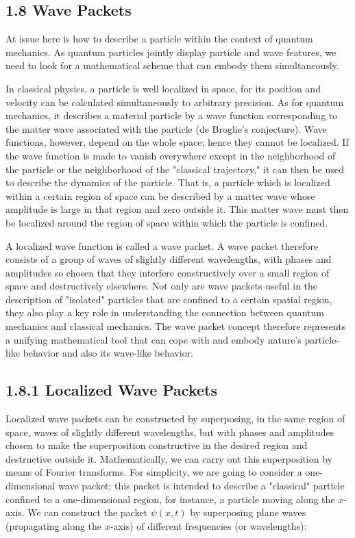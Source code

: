 \documentclass[10pt]{article}
\begin{document}
\subsection*{1.8 Wave Packets}
At issue here is how to describe a particle within the context of quantum mechanics. As quantum particles jointly display particle and wave features, we need to look for a mathematical scheme that can embody them simultaneously.

In classical physics, a particle is well localized in space, for its position and velocity can be calculated simultaneously to arbitrary precision. As for quantum mechanics, it describes a material particle by a wave function corresponding to the matter wave associated with the particle (de Broglie's conjecture). Wave functions, however, depend on the whole space; hence they cannot be localized. If the wave function is made to vanish everywhere except in the neighborhood of the particle or the neighborhood of the "classical trajectory," it can then be used to describe the dynamics of the particle. That is, a particle which is localized within a certain region of space can be described by a matter wave whose amplitude is large in that region and zero outside it. This matter wave must then be localized around the region of space within which the particle is confined.

A localized wave function is called a wave packet. A wave packet therefore consists of a group of waves of slightly different wavelengths, with phases and amplitudes so chosen that they interfere constructively over a small region of space and destructively elsewhere. Not only are wave packets useful in the description of "isolated" particles that are confined to a certain spatial region, they also play a key role in understanding the connection between quantum\\
mechanics and classical mechanics. The wave packet concept therefore represents a unifying mathematical tool that can cope with and embody nature's particle-like behavior and also its wave-like behavior.

\subsection*{1.8.1 Localized Wave Packets}
Localized wave packets can be constructed by superposing, in the same region of space, waves of slightly different wavelengths, but with phases and amplitudes chosen to make the superposition constructive in the desired region and destructive outside it. Mathematically, we can carry out this superposition by means of Fourier transforms. For simplicity, we are going to consider a one-dimensional wave packet; this packet is intended to describe a "classical" particle confined to a one-dimensional region, for instance, a particle moving along the $x$-axis. We can construct the packet $\psi(x, t)$ by superposing plane waves (propagating along the $x$-axis) of different frequencies (or wavelengths):
\end{document}
